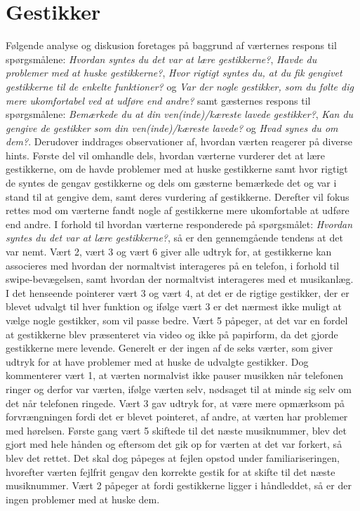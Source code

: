 \section{Gestikker}
\label{TestresultaterSocialAcceptGestikker}
%
Følgende analyse og diskusion foretages på baggrund af værternes respons til spørgsmålene: \textit{Hvordan syntes du det var at lære gestikkerne?}, \textit{Havde du problemer med at huske gestikkerne?}, \textit{Hvor rigtigt syntes du, at du fik gengivet gestikkerne til de enkelte funktioner?} og \textit{Var der nogle gestikker, som du følte dig mere ukomfortabel ved at udføre end andre?} samt gæsternes respons til spørgsmålene: \textit{Bemærkede du at din ven(inde)/kæreste lavede gestikker?}, \textit{Kan du gengive de gestikker som din ven(inde)/kæreste lavede?} og \textit{Hvad synes du om dem?}. Derudover inddrages observationer af, hvordan værten reagerer på diverse hints. Første del vil omhandle dels, hvordan værterne vurderer det at lære gestikkerne, om de havde problemer med at huske gestikkerne samt hvor rigtigt de syntes de gengav gestikkerne og dels om gæsterne bemærkede det og var i stand til at gengive dem, samt deres vurdering af gestikkerne. Derefter vil fokus rettes mod om værterne fandt nogle af gestikkerne mere ukomfortable at udføre end andre.\blankline
%
I forhold til hvordan værterne responderede på spørgsmålet: \textit{Hvordan syntes du det var at lære gestikkerne?}, så er den gennemgående tendens at det var nemt. Vært 2, vært 3 og vært 6 giver alle udtryk for, at gestikkerne kan associeres med hvordan der normaltvist interageres på en telefon, i forhold til swipe-bevægelsen, samt hvordan der normaltvist interageres med et musikanlæg. I det henseende pointerer vært 3 og vært 4, at det er de rigtige gestikker, der er blevet udvalgt til hver funktion og ifølge vært 3 er det nærmest ikke muligt at vælge nogle gestikker, som vil passe bedre. Vært 5 påpeger, at det var en fordel at gestikkerne blev præsenteret via video og ikke på papirform, da det gjorde gestikkerne mere levende. Generelt er der ingen af de seks værter, som giver udtryk for at have problemer med at huske de udvalgte gestikker. Dog kommenterer vært 1, at værten normalvist ikke pauser musikken når telefonen ringer og derfor var værten, ifølge værten selv, nødsaget til at minde sig selv om det når telefonen ringede. Vært 3 gav udtryk for, at være mere opmærksom på forvrængningen fordi det er blevet pointeret, af andre, at værten har problemer med hørelsen. Første gang vært 5 skiftede til det næste musiknummer, blev det gjort med hele hånden og eftersom det gik op for værten at det var forkert, så blev det rettet. Det skal dog påpeges at fejlen opstod under familiariseringen, hvorefter værten fejlfrit gengav den korrekte gestik for at skifte til det næste musiknummer. Vært 2 påpeger at fordi gestikkerne ligger i håndleddet, så er der ingen problemer med at huske dem. 

